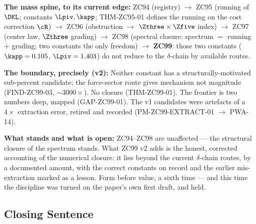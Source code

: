 \documentclass[12pt, a4paper]{article}
\begin{document}
\begin{genealogybox}[title={How ZC99 Sits in the Corpus --- the Edge of Part~M}]
\textbf{The mass spine, to its current edge:}
ZC94 (registry) $\to$ ZC95 (running of $\DKL$; constants $\Lpiv,\kapp$;
THM-ZC95-01 defines the running on the cost correction $\cR$) $\to$
ZC96 (obstruction $\to$ $\Zthree\times\Zfive$ index) $\to$ ZC97 (center law,
$\Zthree$ grading) $\to$ ZC98 (spectral closure: spectrum $=$ running $+$
grading; two constants the only freedom) $\to$ \textbf{ZC99}: those two
constants ($\kapp=0.105$, $\Lpiv=1.403$) do not reduce to the $\delta$-chain by
available routes.

\smallskip
\textbf{The boundary, precisely (v2):}
Neither constant has a structurally-motivated sub-percent candidate; the
force-sector route gives mechanism not magnitude (FIND-ZC99-03, $\sim3000\times$).
No closure (THM-ZC99-01). The frontier is two numbers deep, mapped
(GAP-ZC99-01). The v1 candidates were artefacts of a $4\times$ extraction error,
retired and recorded (PM-ZC99-EXTRACT-01 $\to$ PWA-14).

\smallskip
\textbf{What stands and what is open:}
ZC94--ZC98 are unaffected --- the structural closure of the spectrum stands.
What ZC99 v2 adds is the honest, corrected accounting of the numerical closure:
it lies beyond the current $\delta$-chain routes, by a documented amount, with
the correct constants on record and the earlier mis-extraction marked as a
lesson. Form before value, a sixth time --- and this time the discipline was
turned on the paper's own first draft, and held.
\end{genealogybox}

\subsection{Closing Sentence}
\end{document}
